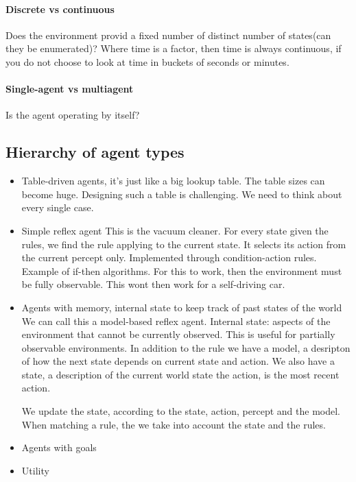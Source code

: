 \documentclass{article}
\begin{document}
\paragraph{Discrete vs continuous}
Does the environment provid a fixed number of distinct number of states(can they
be enumerated)? Where time is a factor, then time is always continuous, if you
do not choose to look at time in buckets of seconds or minutes.

\paragraph{Single-agent vs multiagent}%
\label{par:single_agent_vs_multiagent}
Is the agent operating by itself?

\subsection{Hierarchy of agent types}%
\label{sub:hieryachy_of_agent_types}
\begin{itemize}
  \item Table-driven agents, it's just like a big lookup table. 
    \subitem The table sizes can become huge. Designing such a table is
    challenging. We need to think about every single case.
  \item Simple reflex agent
    \subitem This is the vacuum cleaner. For every state given the rules, we
    find the rule applying to the current state. It selects its action from the
    current percept only. Implemented through condition-action rules. Example of
    if-then algorithms. For this to work, then the environment must be fully
    observable. This wont then work for a self-driving car.
  \item Agents with memory, internal state to keep track of past states of the
    world
    \subitem We can call this a model-based reflex agent. Internal state:
    aspects of the environment that cannot be currently observed. This is useful
    for partially observable environments.
    In addition to the rule we have a model, a desripton of how the next state
    depends on current state and action.
    We also have a state, a description of the current world state
    the action, is the most recent action.

    We update the state, according to the state, action, percept and the model.
    When matching a rule, the we take into account the state and the rules.
  \item Agents with goals
    \subitem 
  \item Utility 
\end{itemize}
\end{document}
